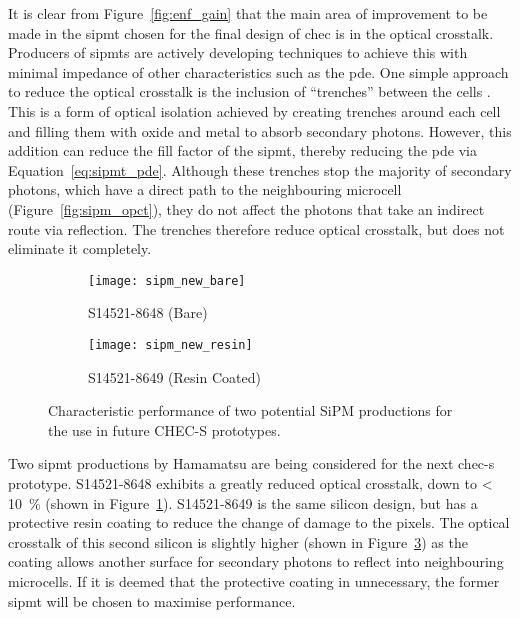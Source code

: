 It is clear from Figure~\ref{fig:enf_gain} that the main area of improvement to be made in the \gls{sipmt} chosen for the final design of \gls{chec} is in the optical crosstalk. Producers of \glspl{sipmt} are actively developing techniques to achieve this with minimal impedance of other characteristics such as the \gls{pde}. One simple approach to reduce the optical crosstalk is the inclusion of ``trenches'' between the cells \cite{Kindt1998,Pagano2011}. This is a form of optical isolation achieved by creating trenches around each cell and filling them with oxide and metal to absorb secondary photons. However, this addition can reduce the fill factor of the \gls{sipmt}, thereby reducing the \gls{pde} via Equation~\ref{eq:sipmt_pde}. Although these trenches stop the majority of secondary photons, which have a direct path to the neighbouring microcell (Figure~\ref{fig:sipm_opct}), they do not affect the photons that take an indirect route via reflection. The trenches therefore reduce optical crosstalk, but does not eliminate it completely.

\begin{figure}
  \begin{subfigure}[b]{0.49\textwidth}
    \texttt{[image: sipm\_new\_bare]}
    \caption{S14521-8648 (Bare) \cite{Hamamatsu2018a}}
    \label{fig:sipm_new_bare}
  \end{subfigure}
  \hfill
  \begin{subfigure}[b]{0.49\textwidth}
    \texttt{[image: sipm\_new\_resin]}
    \caption{S14521-8649 (Resin Coated) \cite{Hamamatsu2018b}}
    \label{fig:sipm_new_resin}
  \end{subfigure}
  \caption[Characteristic performance of future CHEC-S SiPMs.]{Characteristic performance of two potential SiPM productions for the use in future CHEC-S prototypes.}
\end{figure}

Two \gls{sipmt} productions by Hamamatsu are being considered for the next \gls{chec-s} prototype. S14521-8648 exhibits a greatly reduced optical crosstalk, down to \SI{< 10}{\percent} (shown in Figure~\ref{fig:sipm_new_bare}). S14521-8649 is the same silicon design, but has a protective resin coating to reduce the change of damage to the pixels. The optical crosstalk of this second silicon is slightly higher (shown in Figure~\ref{fig:sipm_new_resin}) as the coating allows another surface for secondary photons to reflect into neighbouring microcells. If it is deemed that the protective coating in unnecessary, the former \gls{sipmt} will be chosen to maximise performance.

